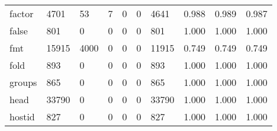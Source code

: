 \begin{longtable}{lp{1.3cm}p{1.3cm}p{1.3cm}p{1.3cm}p{1.3cm}p{1.3cm}p{1.3cm}p{1.3cm}p{1.3cm}}
factor    &                   4701 &                                 53 &                                 7 &                                0 &                                 0 &                            4641 &                                   0.988 &                                  0.989 &                                0.987 \\
false     &                    801 &                                  0 &                                 0 &                                0 &                                 0 &                             801 &                                   1.000 &                                  1.000 &                                1.000 \\
fmt       &                  15915 &                               4000 &                                 0 &                                0 &                                 0 &                           11915 &                                   0.749 &                                  0.749 &                                0.749 \\
fold      &                    893 &                                  0 &                                 0 &                                0 &                                 0 &                             893 &                                   1.000 &                                  1.000 &                                1.000 \\
groups    &                    865 &                                  0 &                                 0 &                                0 &                                 0 &                             865 &                                   1.000 &                                  1.000 &                                1.000 \\
head      &                  33790 &                                  0 &                                 0 &                                0 &                                 0 &                           33790 &                                   1.000 &                                  1.000 &                                1.000 \\
hostid    &                    827 &                                  0 &                                 0 &                                0 &                                 0 &                             827 &                                   1.000 &                                  1.000 &                                1.000 \\

\end{longtable}
